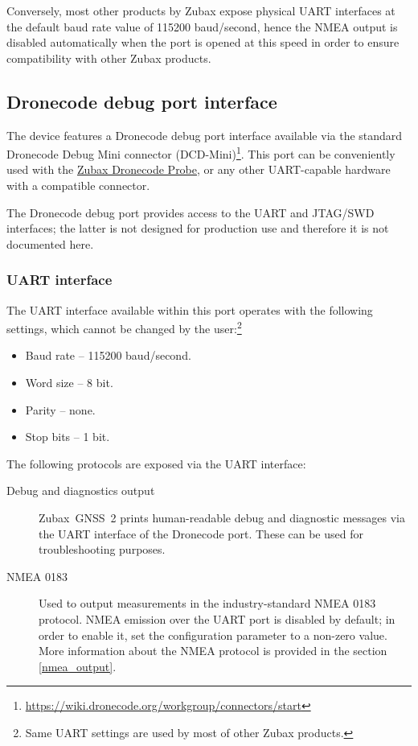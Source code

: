 \documentclass{zubaxdoc}
\begin{document}
Conversely, most other products by Zubax expose physical UART interfaces at the default baud rate
value of 115200 baud/second, hence the NMEA output is disabled automatically when the port is opened at
this speed in order to ensure compatibility with other Zubax products.

\subsection{Dronecode debug port interface}

The device features a Dronecode debug port interface available via the standard
Dronecode Debug Mini connector (DCD-Mini)\footnote{\url{https://wiki.dronecode.org/workgroup/connectors/start}}.
This port can be conveniently used with the \href{https://kb.zubax.com/x/iIAh}{Zubax Dronecode Probe},
or any other UART-capable hardware with a compatible connector.

The Dronecode debug port provides access to the UART and JTAG/SWD interfaces;
the latter is not designed for production use and therefore it is not documented here.

\subsubsection{UART interface}

The UART interface available within this port operates with the following settings,
which cannot be changed by the user:\footnote{
Same UART settings are used by most of other Zubax products.}
\begin{itemize}
    \item Baud rate -- 115200 baud/second.
    \item Word size -- 8 bit.
    \item Parity -- none.
    \item Stop bits -- 1 bit.
\end{itemize}

The following protocols are exposed via the UART interface:
\begin{description}

    \item[Debug and diagnostics output] Zubax~GNSS~2 prints human-readable debug and diagnostic messages
    via the UART interface of the Dronecode port.
    These can be used for troubleshooting purposes.

    \item[NMEA 0183] Used to output measurements in the industry-standard NMEA 0183 protocol.
    NMEA emission over the UART port is disabled by default;
    in order to enable it, set the configuration parameter  to a non-zero value.
    More information about the NMEA protocol is provided in the section \ref{nmea_output}.

\end{description}
\end{document}
